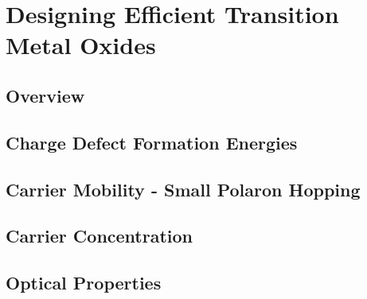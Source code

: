 \chapter{Designing Efficient Transition Metal Oxides}

\section{Overview}

\section{Charge Defect Formation Energies}

\section{Carrier Mobility - Small Polaron Hopping}

\section{Carrier Concentration}

\section{Optical Properties}
